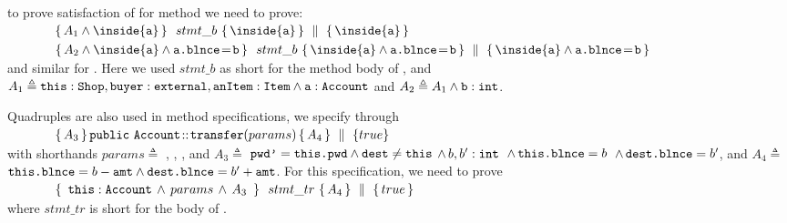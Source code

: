 \Eg to prove satisfaction of  for method  we  need to prove:
\\
$\strut \ \ \ \ \ \ \ \ \ \ \ \quadruple {A_1  \wedge \inside{\prg{a}} } {\ stmt\_b  \ } {\inside{\prg{a}}} { \inside{\prg{a}}} $
\\
$\strut \ \ \ \ \ \  \ \  \ \ \   \quadruple {A_2  \wedge  \inside{\prg{a}} \wedge  \prg{a.\balance}\!=\!{\prg{b}} } {\   stmt\_b  \  } {\inside{\prg{a}} \wedge  \prg{a.\balance}\!=\!\prg{b}}   
                         {  \inside{\prg{a}} \wedge  \prg{a.\balance}\!=\!\prg{b} }$
\\
and similar for . Here we used   $stmt\_b$  as short for the method body of , and $A_1 \triangleq \mbox{\normalfont{\texttt{this}}}:\mbox{\normalfont{\texttt{Shop}}}, \mbox{\normalfont{\texttt{buyer}}}:\mbox{\normalfont{\texttt{external}}}, \mbox{\normalfont{\texttt{anItem}}}:\mbox{\normalfont{\texttt{Item}}} \wedge \mbox{\normalfont{\texttt{a}}}:\mbox{\normalfont{\texttt{Account}}}$
and $A_2 \triangleq A_1 \wedge \mbox{\normalfont{\texttt{b}}}:\mbox{\normalfont{\texttt{int}}}$.
 
Quadruples are also used in method specifications, \eg we specify  through
\\
$\strut \ \ \ \ \ \  \ \  \ \ \  { \mprepostLongN {A_3}{\prg{public}\ \prg{Account}}{\prg{transfer}}{params}{A_4} {true} }$
\\
with shorthands 
$params \triangleq$ , , , and 
$A_3  \triangleq$  $\mbox{\normalfont{\texttt{pwd'}}}=\mbox{\normalfont{\texttt{this.\mbox{\normalfont{\texttt{pwd}}}}}} \wedge \mbox{\normalfont{\texttt{dest}}}\neq \mbox{\normalfont{\texttt{this}}}$
$\wedge\, b, b':\mbox{\normalfont{\texttt{int}}}$
$\, \wedge\, \mbox{\normalfont{\texttt{this.\mbox{\normalfont{\texttt{blnce}}}}}}=b$ 
$\, \wedge\,  \mbox{\normalfont{\texttt{dest.\mbox{\normalfont{\texttt{blnce}}}}}}=b'$, 
 and $A_4 \triangleq$  
 $\mbox{\normalfont{\texttt{this.\mbox{\normalfont{\texttt{blnce}}}}}}=b-\mbox{\normalfont{\texttt{amt}}} \wedge \mbox{\normalfont{\texttt{dest.\mbox{\normalfont{\texttt{blnce}}}}}}=b'+\mbox{\normalfont{\texttt{amt}}}$.
For this specification, we need to prove\\
$\strut \ \ \ \ \ \ \ \ \ \ \ \quadruple {\ \prg{this}:\prg{Account}\, \wedge\, params\, \wedge\, A_3  \  } {\ stmt\_{tr}  \ } {A_4} { true} $
\\
where $stmt\_{tr}$ is short for the body of  .



